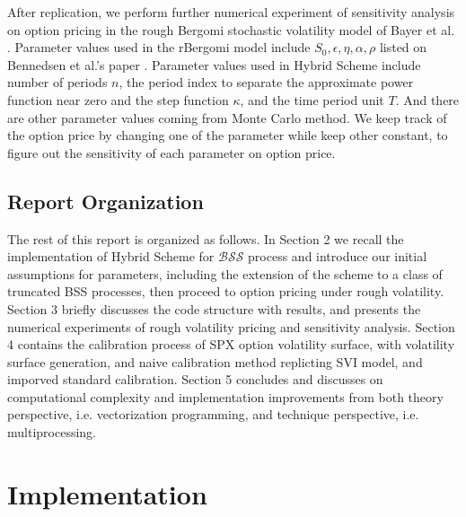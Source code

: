 \documentclass[12pt]{article}
\numberwithin{equation}{section}
\begin{document}
After replication, we perform further numerical experiment of sensitivity analysis on option pricing in the rough Bergomi stochastic volatility model of Bayer et al. \cite{bayer2015pricing}. Parameter values used in the rBergomi model include $S_0, \epsilon, \eta, \alpha, \rho$ listed on Bennedsen et al.'s paper \cite{bennedsen2015hybrid}. Parameter values used in Hybrid Scheme include number of periods $n$, the period index to separate the approximate power function near zero and the step function $\kappa$, and the time period unit $T$. And there are other parameter values coming from Monte Carlo method. We keep track of the option price by changing one of the parameter while keep other constant, to figure out the sensitivity of each parameter on option price.
    
\subsection{Report Organization}
    
The rest of this report is organized as follows. In Section 2 we recall the implementation of Hybrid Scheme for $\mathcal{BSS}$ process and introduce our initial assumptions for parameters, including the extension of the scheme to a class of truncated BSS processes, then proceed to option pricing under rough volatility. Section 3 briefly discusses the code structure with results, and presents the numerical experiments of rough volatility pricing and sensitivity analysis. Section 4 contains the calibration process of SPX option volatility surface, with volatility surface generation, and naive calibration method replicting SVI model, and imporved standard calibration. Section 5 concludes and discusses on computational complexity and implementation improvements from both theory perspective, i.e. vectorization programming, and technique perspective, i.e. multiprocessing.

%
%
%
%

\section{Implementation}
\end{document}
